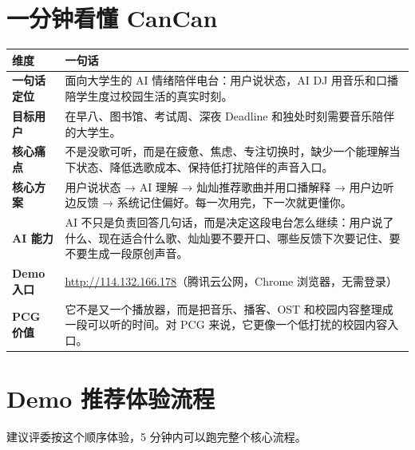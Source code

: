 \documentclass[UTF8,a4paper,11pt,fontset=windows]{ctexart}
\begin{document}
\section{一分钟看懂 CanCan}

\begin{longtable}{>{\bfseries}p{3.2cm}p{11.4cm}}
\toprule
维度 & 一句话 \\
\midrule
一句话定位 & 面向大学生的 AI 情绪陪伴电台：用户说状态，AI DJ 用音乐和口播陪学生度过校园生活的真实时刻。 \\
目标用户 & 在早八、图书馆、考试周、深夜 Deadline 和独处时刻需要音乐陪伴的大学生。 \\
核心痛点 & 不是没歌可听，而是在疲惫、焦虑、专注切换时，缺少一个能理解当下状态、降低选歌成本、保持低打扰陪伴的声音入口。 \\
核心方案 & 用户说状态 → AI 理解 → 灿灿推荐歌曲并用口播解释 → 用户边听边反馈 → 系统记住偏好。每一次用完，下一次就更懂你。 \\
AI 能力 & AI 不只是负责回答几句话，而是决定这段电台怎么继续：用户说了什么、现在适合什么歌、灿灿要不要开口、哪些反馈下次要记住、要不要生成一段原创声音。 \\
Demo 入口 & \href{http://114.132.166.178}{http://114.132.166.178}（腾讯云公网，Chrome 浏览器，无需登录） \\
PCG 价值 & 它不是又一个播放器，而是把音乐、播客、OST 和校园内容整理成一段可以听的时间。对 PCG 来说，它更像一个低打扰的校园内容入口。 \\
\bottomrule
\end{longtable}

\section{Demo 推荐体验流程}

建议评委按这个顺序体验，5 分钟内可以跑完整个核心流程。
\end{document}
